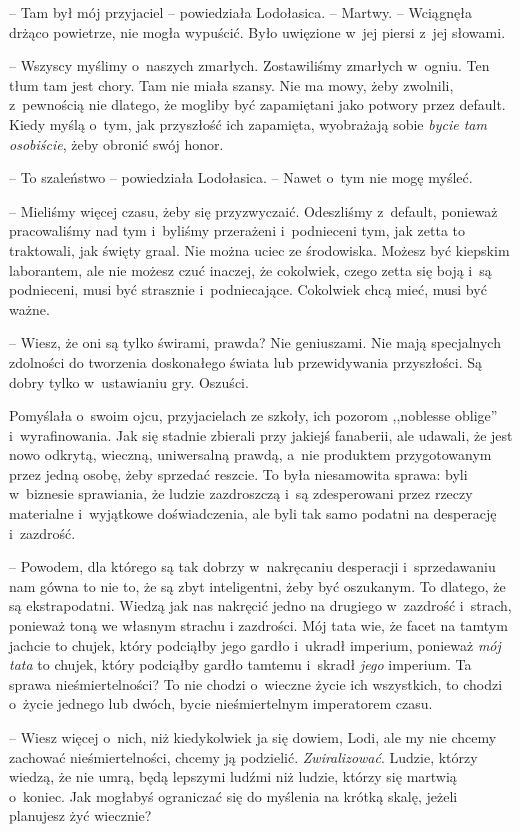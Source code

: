 \documentclass[oneside,polish,11pt,sfheadings]{mwbk}
\begin{document}
-- Tam był mój przyjaciel -- powiedziała Lodołasica. -- Martwy. -- Wciągnęła
drżąco powietrze, nie mogła wypuścić. Było uwięzione w~jej piersi z~jej
słowami.

-- Wszyscy myślimy o~naszych zmarłych. Zostawiliśmy zmarłych w~ogniu. Ten
tłum tam jest chory. Tam nie miała szansy. Nie ma mowy, żeby zwolnili, z~pewnością nie dlatego, że mogliby być zapamiętani jako potwory przez
default. Kiedy myślą o~tym, jak przyszłość ich zapamięta, wyobrażają
sobie \textit{bycie tam osobiście}, żeby obronić swój honor.

-- To szaleństwo -- powiedziała Lodołasica. -- Nawet o~tym nie mogę myśleć.

-- Mieliśmy więcej czasu, żeby się przyzwyczaić. Odeszliśmy z~default,
ponieważ pracowaliśmy nad tym i~byliśmy przerażeni i~podnieceni tym, jak
zetta to traktowali, jak święty graal. Nie można uciec ze środowiska.
Możesz być kiepskim laborantem, ale nie możesz czuć inaczej, że
cokolwiek, czego zetta się boją i~są podnieceni, musi być strasznie i~podniecające. Cokolwiek chcą mieć, musi być ważne.

-- Wiesz, że oni są tylko świrami, prawda? Nie geniuszami. Nie mają
specjalnych zdolności do tworzenia doskonałego świata lub przewidywania
przyszłości. Są dobry tylko w~ustawianiu gry. Oszuści. 

Pomyślała o~swoim ojcu, przyjacielach ze szkoły, ich pozorom ,,noblesse oblige'' i~wyrafinowania. Jak się stadnie zbierali przy jakiejś fanaberii, ale
udawali, że jest nowo odkrytą, wieczną, uniwersalną prawdą, a~nie
produktem przygotowanym przez jedną osobę, żeby sprzedać reszcie. To
była niesamowita sprawa: byli w~biznesie sprawiania, że ludzie
zazdroszczą i~są zdesperowani przez rzeczy materialne i~wyjątkowe
doświadczenia, ale byli tak samo podatni na desperację i~zazdrość.

-- Powodem, dla którego są tak dobrzy w~nakręcaniu desperacji i~sprzedawaniu nam gówna to nie to, że są zbyt inteligentni, żeby być
oszukanym. To dlatego, że są ekstrapodatni. Wiedzą jak nas nakręcić
jedno na drugiego w~zazdrość i~strach, ponieważ toną we własnym strachu
i zazdrości. Mój tata wie, że facet na tamtym jachcie to chujek, który
podciąłby jego gardło i~ukradł imperium, ponieważ \textit{mój tata} to
chujek, który podciąłby gardło tamtemu i~skradł \textit{jego} imperium. Ta
sprawa nieśmiertelności? To nie chodzi o~wieczne życie ich wszystkich,
to chodzi o~życie jednego lub dwóch, bycie nieśmiertelnym imperatorem
czasu.

-- Wiesz więcej o~nich, niż kiedykolwiek ja się dowiem, Lodi, ale my nie
chcemy zachować nieśmiertelności, chcemy ją podzielić.
\textit{Zwiralizować}. Ludzie, którzy wiedzą, że nie umrą, będą lepszymi
ludźmi niż ludzie, którzy się martwią o~koniec. Jak mogłabyś ograniczać
się do myślenia na krótką skalę, jeżeli planujesz żyć wiecznie?
\end{document}
